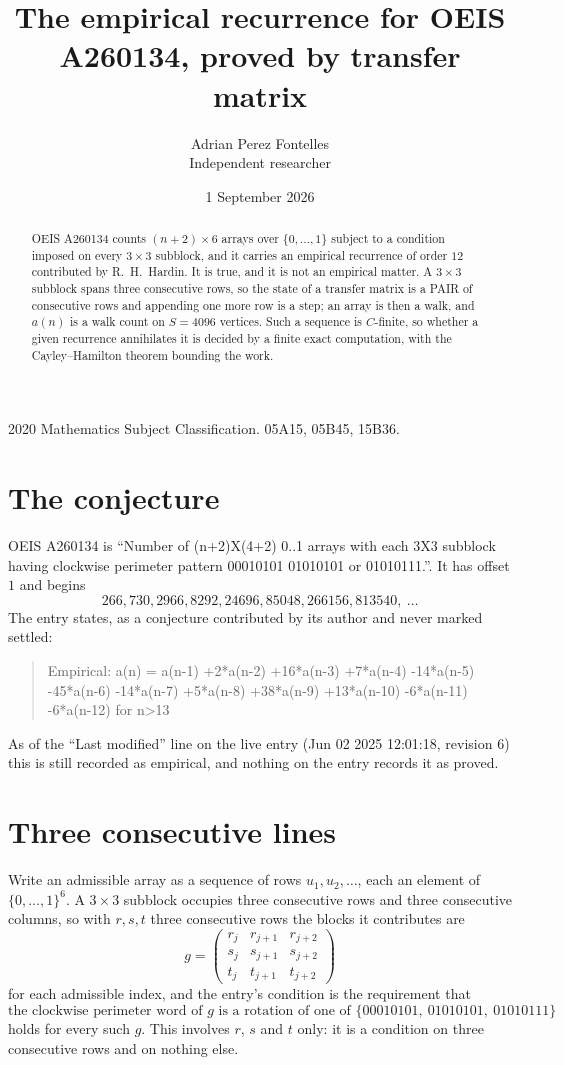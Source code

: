 \documentclass[11pt,a4paper]{article}
\title{The empirical recurrence for OEIS A260134, proved by transfer matrix}
\author{Adrian Perez Fontelles\\ \small Independent researcher}
\date{1 September 2026}
\theoremstyle{plain}
\theoremstyle{definition}
\begin{document}
\maketitle

\begin{abstract}
OEIS A260134 counts $(n+2)\times6$ arrays over $\{0,\dots,1\}$ subject to a condition imposed on
every $3\times3$ subblock, and it carries an empirical recurrence of order $12$
contributed by R.~H.~Hardin. It is true, and it is not an empirical matter. A $3\times3$
subblock spans three consecutive rows, so the state of a transfer matrix is a PAIR of
consecutive rows and appending one more row is a step; an array is then a walk, and
$a(n)$ is a walk count on $S=4096$ vertices. Such a sequence is $C$-finite, so whether a given
recurrence annihilates it is decided by a finite exact computation, with the Cayley--Hamilton
theorem bounding the work.
\end{abstract}

\noindent\small 2020 Mathematics Subject Classification. 05A15, 05B45, 15B36.\normalsize

\section{The conjecture}

OEIS A260134 is ``Number of (n+2)X(4+2) 0..1 arrays with each 3X3 subblock having clockwise perimeter pattern 00010101 01010101 or 01010111.''. It has offset $1$ and begins
\[
266, 730, 2966, 8292, 24696, 85048, 266156, 813540,\ \dots
\]
The entry states, as a conjecture contributed by its author and never marked settled:
\begin{quote}
Empirical: a(n) = a(n-1) +2*a(n-2) +16*a(n-3) +7*a(n-4) -14*a(n-5) -45*a(n-6) -14*a(n-7) +5*a(n-8) +38*a(n-9) +13*a(n-10) -6*a(n-11) -6*a(n-12) for n>13
\end{quote}
As of the ``Last modified'' line on the live entry (Jun 02 2025 12:01:18, revision 6) this is still
recorded as empirical, and nothing on the entry records it as proved.

\section{Three consecutive lines}

Write an admissible array as a sequence of rows $u_1,u_2,\dots$, each an element of
$\{0,\dots,1\}^{6}$. A $3\times3$ subblock occupies three consecutive rows and
three consecutive columns, so with $r,s,t$ three consecutive rows the blocks it
contributes are
\[
g=\begin{pmatrix}r_j&r_{j+1}&r_{j+2}\\ s_j&s_{j+1}&s_{j+2}\\ t_j&t_{j+1}&t_{j+2}\end{pmatrix}
\]
for each admissible index, and the entry's condition is the requirement that
\[
\text{the clockwise perimeter word of }g\text{ is a rotation of one of }\{00010101,\ 01010101,\ 01010111\}
\]
holds for every such $g$. This involves $r$, $s$ and $t$ only: it is a condition on
three consecutive rows and on nothing else.
\end{document}
